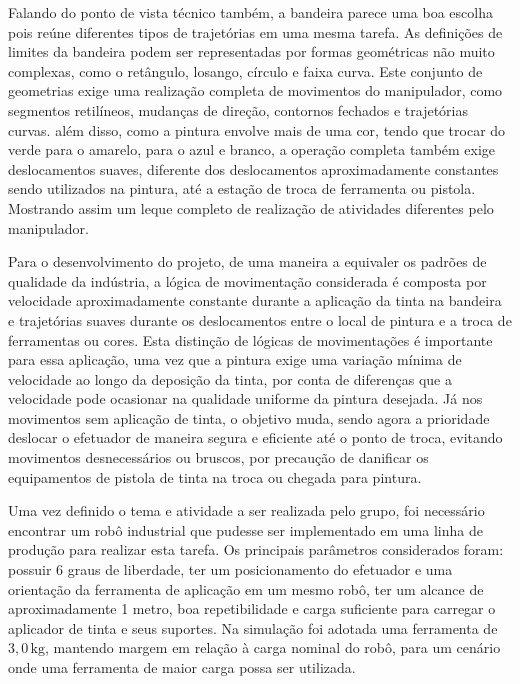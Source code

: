 Falando do ponto de vista técnico também, a bandeira parece uma boa escolha pois reúne diferentes tipos de trajetórias em uma mesma tarefa. As definições de limites da bandeira podem ser representadas por formas geométricas não muito complexas, como o retângulo, losango, círculo e faixa curva. Este conjunto de geometrias exige uma realização completa de movimentos do manipulador, como segmentos retilíneos, mudanças de direção, contornos fechados e trajetórias curvas. além disso, como a pintura envolve mais de uma cor, tendo que trocar do verde para o amarelo, para o azul e branco, a operação completa também exige deslocamentos suaves, diferente dos deslocamentos aproximadamente constantes sendo utilizados na pintura, até a estação de troca de ferramenta ou pistola. Mostrando assim um leque completo de realização de atividades diferentes pelo manipulador.

Para o desenvolvimento do projeto, de uma maneira a equivaler os padrões de qualidade da indústria, a lógica de movimentação considerada é composta por velocidade aproximadamente constante durante a aplicação da tinta na bandeira e trajetórias suaves durante os deslocamentos entre o local de pintura e a troca de ferramentas ou cores. Esta distinção de lógicas de movimentações é importante para essa aplicação, uma vez que a pintura exige uma variação mínima de velocidade ao longo da deposição da tinta, por conta de diferenças que a velocidade pode ocasionar na qualidade uniforme da pintura desejada. Já nos movimentos sem aplicação de tinta, o objetivo muda, sendo agora a prioridade deslocar o efetuador de maneira segura e eficiente até o ponto de troca, evitando movimentos desnecessários ou bruscos, por precaução de danificar os equipamentos de pistola de tinta na troca ou chegada para pintura.

Uma vez definido o tema e atividade a ser realizada pelo grupo, foi necessário encontrar um robô industrial que pudesse ser implementado em uma linha de produção para realizar esta tarefa. Os principais parâmetros considerados foram: possuir 6 graus de liberdade, ter um posicionamento do efetuador e uma orientação da ferramenta de aplicação em um mesmo robô, ter um alcance de aproximadamente 1 metro, boa repetibilidade e carga suficiente para carregar o aplicador de tinta e seus suportes. Na simulação foi adotada uma ferramenta de $3{,}0\,\text{kg}$, mantendo margem em relação à carga nominal do robô, para um cenário onde uma ferramenta de maior carga possa ser utilizada.

